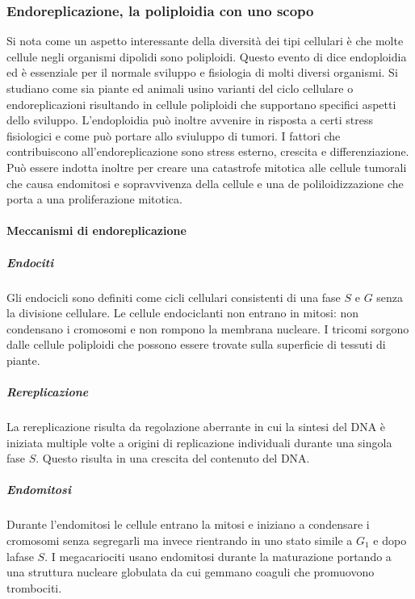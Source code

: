 \subsubsection{Endoreplicazione, la poliploidia con uno scopo}
Si nota come un aspetto interessante della diversit\`a dei tipi cellulari \`e che molte cellule negli organismi dipolidi sono poliploidi. Questo evento di dice endoploidia ed \`e 
essenziale per il normale sviluppo e fisiologia di molti diversi organismi. Si studiano come sia piante ed animali usino varianti del ciclo cellulare o endoreplicazioni risultando in
cellule poliploidi che supportano specifici aspetti dello sviluppo. L'endoploidia pu\`o inoltre avvenire in risposta a certi stress fisiologici e come pu\`o portare allo sviuluppo di 
tumori. I fattori che contribuiscono all'endoreplicazione sono stress esterno, crescita e differenziazione. Pu\`o essere indotta inoltre per creare una catastrofe mitotica alle 
cellule tumorali che causa endomitosi e sopravvivenza della cellule e una de poliloidizzazione che porta a una proliferazione mitotica. 
\paragraph{Meccanismi di endoreplicazione}
\subparagraph{Endociti}
Gli endocicli sono definiti come cicli cellulari consistenti di una fase $S$ e $G$ senza la divisione cellulare. Le cellule endociclanti non entrano in mitosi: non condensano i 
cromosomi e non rompono la membrana nucleare. I tricomi sorgono dalle cellule poliploidi che possono essere trovate sulla superficie di tessuti di piante. 
\subparagraph{Rereplicazione}
La rereplicazione risulta da regolazione aberrante in cui la sintesi del DNA \`e iniziata multiple volte a origini di replicazione individuali durante una singola fase $S$. Questo 
risulta in una crescita del contenuto del DNA.
\subparagraph{Endomitosi}
Durante l'endomitosi  le cellule entrano la mitosi e iniziano a condensare i cromosomi senza segregarli ma invece rientrando in uno stato simile a $G_1$ e dopo lafase $S$. I 
megacariociti usano endomitosi durante la maturazione portando a una struttura nucleare globulata da cui gemmano coaguli che promuovono trombociti. 
